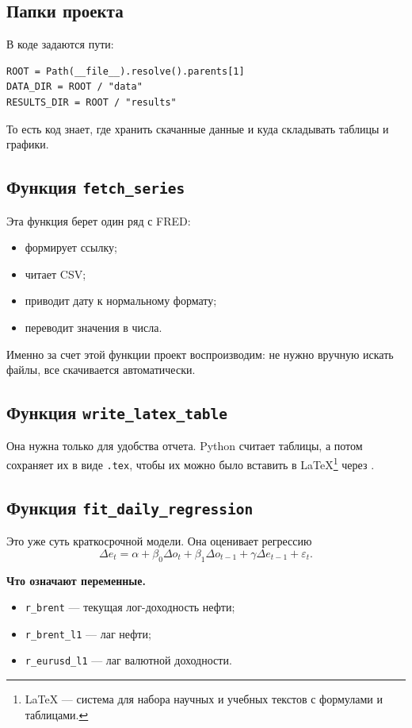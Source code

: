 \documentclass[a4paper,12pt]{article}
\begin{document}
\subsection{Папки проекта}
В коде задаются пути:
\begin{verbatim}
ROOT = Path(__file__).resolve().parents[1]
DATA_DIR = ROOT / "data"
RESULTS_DIR = ROOT / "results"
\end{verbatim}
То есть код знает, где хранить скачанные данные и куда складывать таблицы и графики.

\subsection{Функция \texttt{fetch\_series}}
Эта функция берет один ряд с FRED:
\begin{itemize}
    \item формирует ссылку;
    \item читает CSV;
    \item приводит дату к нормальному формату;
    \item переводит значения в числа.
\end{itemize}

Именно за счет этой функции проект воспроизводим: не нужно вручную искать файлы, все скачивается автоматически.

\subsection{Функция \texttt{write\_latex\_table}}
Она нужна только для удобства отчета. Python считает таблицы, а потом сохраняет их в виде \texttt{.tex}, чтобы их можно было вставить в LaTeX\footnote{LaTeX --- система для набора научных и учебных текстов с формулами и таблицами.} через \verb||.

\subsection{Функция \texttt{fit\_daily\_regression}}
Это уже суть краткосрочной модели. Она оценивает регрессию
\[
\Delta e_t=\alpha+\beta_0\Delta o_t+\beta_1\Delta o_{t-1}+\gamma\Delta e_{t-1}+\varepsilon_t.
\]

\textbf{Что означают переменные.}
\begin{itemize}
    \item \texttt{r\_brent} --- текущая лог-доходность нефти;
    \item \texttt{r\_brent\_l1} --- лаг нефти;
    \item \texttt{r\_eurusd\_l1} --- лаг валютной доходности.
\end{itemize}
\end{document}
